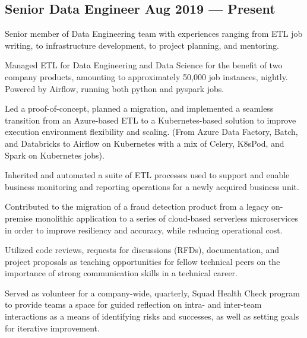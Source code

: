 \documentclass[letter,10pt]{article}
\begin{document}
\subsection{{Senior Data Engineer \hfill Aug 2019 --- Present}}

\vspace{10pt}

Senior member of Data Engineering team with experiences ranging from ETL job writing, to infrastructure development, to project planning, and mentoring.

\vspace{10pt}

\begin{zitemize}
    \item Managed ETL for Data Engineering and Data Science for the benefit of two company products, amounting to approximately 50,000 job instances, nightly. Powered by Airflow, running both python and pyspark jobs.
    \item Led a proof-of-concept, planned a migration, and implemented a seamless transition from an Azure-based ETL to a Kubernetes-based solution to improve execution environment flexibility and scaling. (From Azure Data Factory, Batch, and Databricks to Airflow on Kubernetes with a mix of Celery, K8sPod, and Spark on Kubernetes jobs).
    \item Inherited and automated a suite of ETL processes used to support and enable business monitoring and reporting operations for a newly acquired business unit.
    \item Contributed to the migration of a fraud detection product from a legacy on-premise monolithic application to a series of cloud-based serverless microservices in order to improve resiliency and accuracy, while reducing operational cost.
    \item Utilized code reviews, requests for discussions (RFDs), documentation, and project proposals as teaching opportunities for fellow technical peers on the importance of strong communication skills in a technical career.
    \item Served as volunteer for a company-wide, quarterly, Squad Health Check program to provide teams a space for guided reflection on intra- and inter-team interactions as a means of identifying risks and successes, as well as setting goals for iterative improvement.
\end{zitemize}
\end{document}

